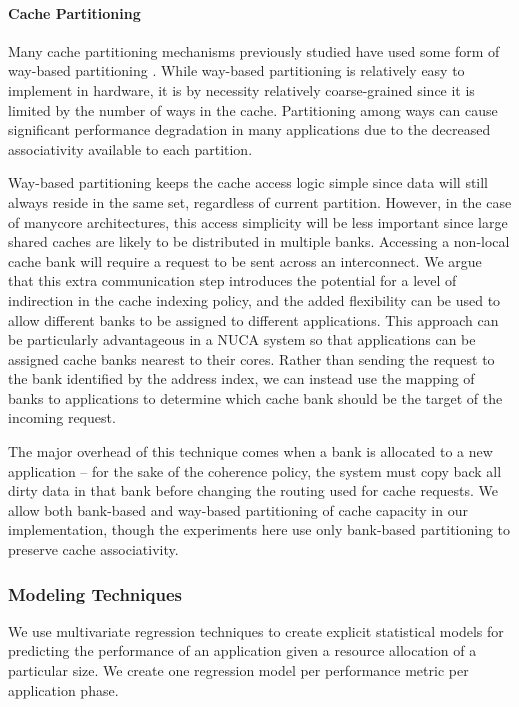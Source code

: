 \paragraph{Cache Partitioning}
Many cache partitioning mechanisms previously studied have used some form of way-based partitioning \cite{1331730,1152161,605420,1250671,1194855,1086328,1399982}.  While way-based partitioning is relatively easy to implement in hardware, it is by necessity relatively coarse-grained since it is limited by the number of ways in the cache.  Partitioning among ways can cause significant performance degradation in many applications due to the decreased associativity available to each partition.

Way-based partitioning keeps the cache access logic simple since data will still always reside in the same set, regardless of current partition.  However, in the case of manycore architectures, this access simplicity will be less important since large shared caches are likely to be distributed in multiple banks.  Accessing a non-local cache bank will require a request to be sent across an interconnect. We argue that this extra communication step introduces the potential for a level of indirection in the cache indexing policy, and the added flexibility can be used to allow different banks to be assigned to different applications. This approach can be particularly advantageous in a NUCA system so that applications can be assigned cache banks nearest to their cores. Rather than sending the request to the bank identified by the address index, we can instead use the mapping of banks to applications to determine which cache bank should be the target of the incoming request.

The major overhead of this technique comes when a bank is allocated to a new application -- for the sake of the coherence policy, the system must copy back all dirty data in that bank before changing the routing used for cache requests.  We allow both bank-based and way-based partitioning of cache capacity in our implementation, though the experiments here use only bank-based partitioning to preserve cache associativity.



\subsubsection*{Modeling Techniques}
We use multivariate regression techniques to create explicit statistical models for predicting the performance of an application given a resource allocation of a particular size.  We create one regression model per performance metric per application phase.

